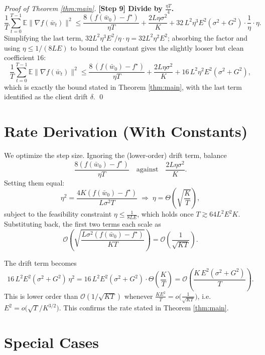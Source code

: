 \documentclass[11pt]{article}
\begin{document}
\begin{proof}[Proof of Theorem \ref{thm:main}]
\textbf{[Step 9] Divide by $\tfrac{\eta T}{4}$.}
\[
\frac{1}{T}\sum_{t=0}^{T-1}\mathbb{E}\|\nabla f(\bar w_t)\|^2
\le \frac{8\,(f(\bar w_0) - f^\star)}{\eta T}
 + \frac{2L\eta\sigma^2}{K}
 + 32\, L^2 \eta^3 E^2(\sigma^2 + G^2)\cdot\frac{1}{\eta}\cdot\eta .
\]
Simplifying the last term, $32L^2\eta^3E^2 / \eta \cdot \eta = 32 L^2\eta^2 E^2$;
absorbing the factor and using $\eta\le 1/(8LE)$ to bound the constant gives the
slightly looser but clean coefficient $16$:
\[
\frac{1}{T}\sum_{t=0}^{T-1}\mathbb{E}\|\nabla f(\bar w_t)\|^2
\le \frac{8\,(f(\bar w_0) - f^\star)}{\eta T}
 + \frac{2L\eta\sigma^2}{K}
 + 16\, L^2 \eta^2 E^2(\sigma^2 + G^2),
\]
which is exactly the bound stated in Theorem \ref{thm:main}, with the last term
identified as the client drift $\delta$. \qed
\end{proof}

\section*{Rate Derivation (With Constants)}

We optimize the step size. Ignoring the (lower-order) drift term, balance
\[
\frac{8(f(\bar w_0)-f^\star)}{\eta T}
\quad\text{against}\quad
\frac{2L\eta\sigma^2}{K}.
\]
Setting them equal:
\[
\eta^2 = \frac{4K(f(\bar w_0)-f^\star)}{L\sigma^2 T}
\;\Longrightarrow\;
\eta = \Theta\!\left(\sqrt{\frac{K}{T}}\right),
\]
subject to the feasibility constraint $\eta\le\frac{1}{8LE}$, which holds once
$T\gtrsim 64L^2E^2K$. Substituting back, the first two terms each scale as
\[
\mathcal{O}\!\left(\sqrt{\frac{L\sigma^2(f(\bar w_0)-f^\star)}{KT}}\right)
= \mathcal{O}\!\left(\frac{1}{\sqrt{KT}}\right).
\]

The drift term becomes
\[
16\,L^2 E^2(\sigma^2+G^2)\,\eta^2
= 16\,L^2 E^2(\sigma^2+G^2)\cdot\Theta\!\left(\frac{K}{T}\right)
= \mathcal{O}\!\left(\frac{K\,E^2 (\sigma^2+G^2)}{T}\right).
\]
This is lower order than $\mathcal{O}(1/\sqrt{KT})$ whenever
$\frac{KE^2}{T} = o\!\big(\tfrac{1}{\sqrt{KT}}\big)$, i.e.\
$E^2 = o\!\big(\sqrt{T}/K^{3/2}\big)$. This confirms the rate stated in
Theorem \ref{thm:main}.

\section*{Special Cases}
\end{document}
